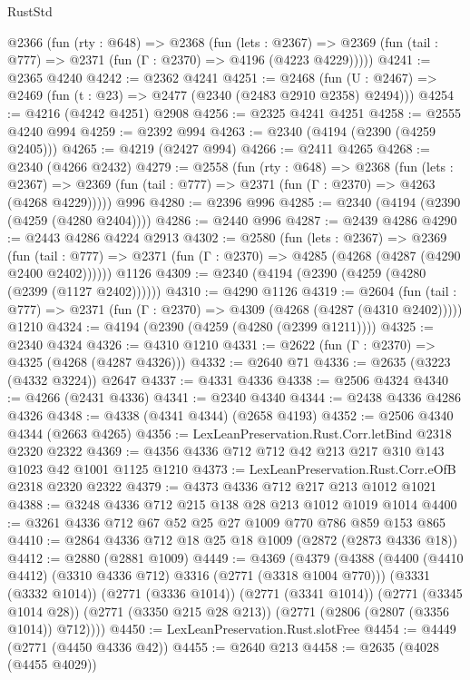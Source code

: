 \begin{lexlean}{RustStd}
\begin{coremodule}
  @2366
    (fun (rty : @648) =>
    @2368
      (fun (lets : @2367) =>
      @2369 (fun (tail : @777) => @2371 (fun (Γ : @2370) => @4196 (@4223 @4229)))))
@4241 := @2365 @4240
@4242 := @2362 @4241
@4251 := @2468 (fun (U : @2467) => @2469 (fun (t : @23) => @2477 (@2340 (@2483 @2910 @2358) @2494)))
@4254 := @4216 (@4242 @4251) @2908
@4256 := @2325 @4241 @4251
@4258 := @2555 @4240 @994
@4259 := @2392 @994
@4263 := @2340 (@4194 (@2390 (@4259 @2405)))
@4265 := @4219 (@2427 @994)
@4266 := @2411 @4265
@4268 := @2340 (@4266 @2432)
@4279 := @2558
    (fun (rty : @648) =>
    @2368
      (fun (lets : @2367) =>
      @2369 (fun (tail : @777) => @2371 (fun (Γ : @2370) => @4263 (@4268 @4229)))))
    @996
@4280 := @2396 @996
@4285 := @2340 (@4194 (@2390 (@4259 (@4280 @2404))))
@4286 := @2440 @996
@4287 := @2439 @4286
@4290 := @2443 @4286 @4224 @2913
@4302 := @2580
    (fun (lets : @2367) =>
    @2369
      (fun (tail : @777) => @2371 (fun (Γ : @2370) => @4285 (@4268 (@4287 (@4290 @2400 @2402))))))
    @1126
@4309 := @2340 (@4194 (@2390 (@4259 (@4280 (@2399 (@1127 @2402))))))
@4310 := @4290 @1126
@4319 := @2604
    (fun (tail : @777) => @2371 (fun (Γ : @2370) => @4309 (@4268 (@4287 (@4310 @2402)))))
    @1210
@4324 := @4194 (@2390 (@4259 (@4280 (@2399 @1211))))
@4325 := @2340 @4324
@4326 := @4310 @1210
@4331 := @2622 (fun (Γ : @2370) => @4325 (@4268 (@4287 @4326)))
@4332 := @2640 @71
@4336 := @2635 (@3223 (@4332 @3224)) @2647
@4337 := @4331 @4336
@4338 := @2506 @4324
@4340 := @4266 (@2431 @4336)
@4341 := @2340 @4340
@4344 := @2438 @4336 @4286 @4326
@4348 := @4338 (@4341 @4344) (@2658 @4193)
@4352 := @2506 @4340 @4344 (@2663 @4265)
@4356 := LexLeanPreservation.Rust.Corr.letBind @2318 @2320 @2322
@4369 := @4356 @4336 @712 @712 @42 @213 @217 @310 @143 @1023 @42 @1001 @1125 @1210
@4373 := LexLeanPreservation.Rust.Corr.eOfB @2318 @2320 @2322
@4379 := @4373 @4336 @712 @217 @213 @1012 @1021
@4388 := @3248 @4336 @712 @215 @138 @28 @213 @1012 @1019 @1014
@4400 := @3261 @4336 @712 @67 @52 @25 @27 @1009 @770 @786 @859 @153 @865
@4410 := @2864 @4336 @712 @18 @25 @18 @1009 (@2872 (@2873 @4336 @18))
@4412 := @2880 (@2881 @1009)
@4449 := @4369
    (@4379
      (@4388
        (@4400 (@4410 @4412) (@3310 @4336 @712) @3316 (@2771 (@3318 @1004 @770)))
        (@3331 (@3332 @1014))
        (@2771 (@3336 @1014))
        (@2771 (@3341 @1014))
        (@2771 (@3345 @1014 @28))
        (@2771 (@3350 @215 @28 @213))
        (@2771 (@2806 (@2807 (@3356 @1014)) @712))))
@4450 := LexLeanPreservation.Rust.slotFree
@4454 := @4449 (@2771 (@4450 @4336 @42))
@4455 := @2640 @213
@4458 := @2635 (@4028 (@4455 @4029))

\end{coremodule}
\end{lexlean}
